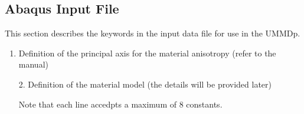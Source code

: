 \documentclass[11pt,a4paper,twoside,final,onecolumn,titlepage]{article}
\begin{document}
\vspace{0.2cm}
\subsection{Abaqus Input File}
\vspace{0.2cm}

This section describes the keywords in the input data file for use in the UMMDp.

\begin{enumerate}
	\item Definition of the principal axis for the material anisotropy (refer to the manual)
	\par\bigskip
	\texttt{}
	\par\bigskip
\end{enumerate}

\begin{enumerate}
	\item[2.] Definition of the material model (the details will be provided later)\\
	\par
	\texttt{}
	\item[] Note that each line accedpts a maximum of 8 constants.
	\par\bigskip
\end{enumerate}
\end{document}
